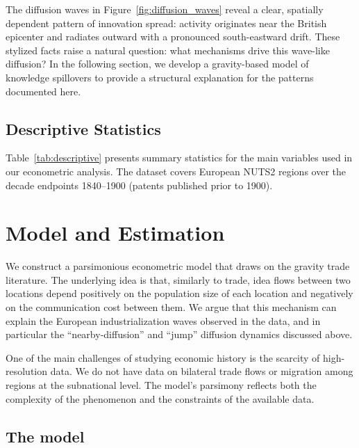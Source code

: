 \documentclass[letterpaper,12pt,leqno]{article}
\begin{document}
The diffusion waves in Figure~\ref{fig:diffusion_waves} reveal a clear, spatially dependent pattern of innovation spread: activity originates near the British epicenter and radiates outward with a pronounced south-eastward drift. These stylized facts raise a natural question: what mechanisms drive this wave-like diffusion? In the following section, we develop a gravity-based model of knowledge spillovers to provide a structural explanation for the patterns documented here.

\subsection{Descriptive Statistics}

Table~\ref{tab:descriptive} presents summary statistics for the main variables used in our econometric analysis. The dataset covers European NUTS2 regions over the decade endpoints 1840--1900 (patents published prior to 1900).



\section{Model and Estimation}
We construct a parsimonious econometric model that draws on the gravity trade literature.
The underlying idea is that, similarly to trade, idea flows between two locations depend positively on the population size of each location and negatively on the communication cost between them. We argue that this mechanism can explain the European industrialization waves observed in the data, and in particular the ``nearby-diffusion'' and ``jump'' diffusion dynamics discussed above.

One of the main challenges of studying economic history is the scarcity of high-resolution data. We do not have data on bilateral trade flows or migration among regions at the subnational level. The model's parsimony reflects both the complexity of the phenomenon and the constraints of the available data.
\subsection{The model}
\end{document}
